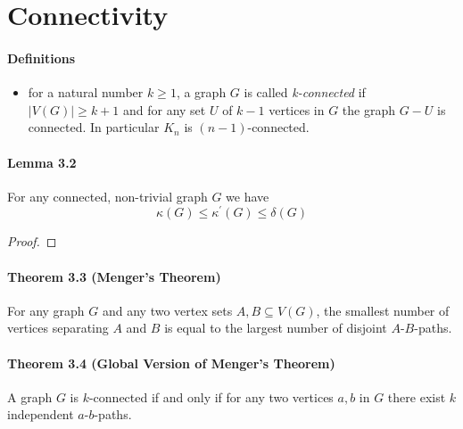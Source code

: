 \section{Connectivity}

\paragraph{Definitions}
\begin{itemize}
    \item for a natural number $ k \geq 1 $, a graph $ G $ is called 
    \textit{k-connected} if $ |V(G)| \geq k + 1 $ and for any set $ U $ of $ k - 1 $
    vertices in $ G $ the graph $ G - U $ is connected. In particular $ K_n $ is
    $(n-1)$-connected.
    
\end{itemize}

\paragraph{Lemma 3.2} For any connected, non-trivial graph $ G $ we have
$$ \kappa(G) \leq \kappa^\prime(G) \leq \delta(G) $$
\begin{proof}
    
\end{proof}

\paragraph{Theorem 3.3 (Menger's Theorem)} For any graph $ G $ and any two 
vertex sets $ A,B \subseteq V(G) $, the smallest number of vertices separating 
$ A $ and $ B $ is equal to the largest number of disjoint $A$-$B$-paths.

\paragraph{Theorem 3.4 (Global Version of Menger's Theorem)} A graph $ G $ is 
$k$-connected if and only if for any two vertices $ a,b $ in $ G $ there exist 
$ k $ independent $a$-$b$-paths.


